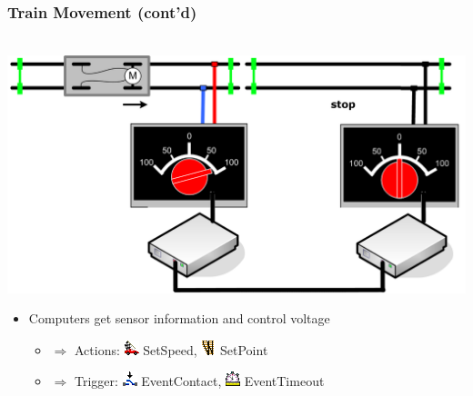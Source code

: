 \begin{frame}
  \frametitle{Train Movement (cont'd)}
\hspace{0.8cm}~\includegraphics[scale=0.12]{images/segment-trains3.png}
\begin{itemize}
  \item Computers get sensor information and control voltage
  \pause
	\begin{itemize}
		  \item $\Rightarrow$ Actions: \includegraphics[scale=0.8]{images/SetSpeed.png} SetSpeed, \includegraphics[scale=0.8]{images/SetPoint.png} SetPoint
		  \item $\Rightarrow$ Trigger: \includegraphics[scale=0.8]{images/EventContact.png} EventContact, \includegraphics[scale=0.8]{images/EventWait.png} EventTimeout
	\end{itemize}
\end{itemize}
  \end{frame}


